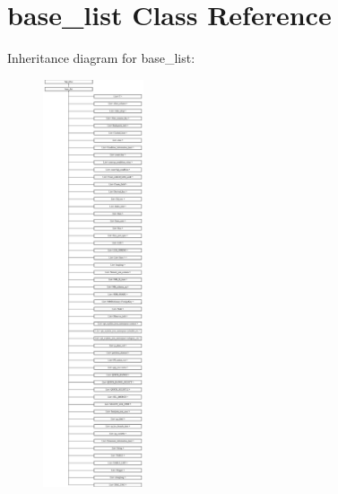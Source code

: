 \hypertarget{classbase__list}{}\section{base\+\_\+list Class Reference}
\label{classbase__list}
Inheritance diagram for base\+\_\+list\+:\begin{figure}[H]
\begin{center}
\leavevmode
\includegraphics[height=12.000000cm]{classbase__list}
\end{center}
\end{figure}
